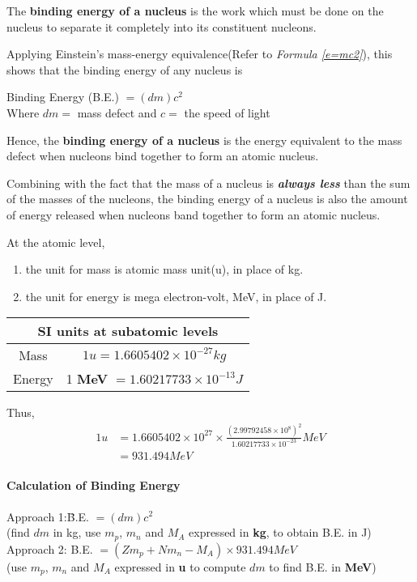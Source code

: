 \begin{defi}
The \textbf{binding energy of a nucleus} is the work which must be done on the nucleus to separate it completely into its constituent nucleons.
\end{defi}
Applying Einstein's mass-energy equivalence(Refer to \textit{Formula \ref{e=mc2}}), this shows that the binding energy of any nucleus is
\begin{form}
Binding Energy (B.E.) $ = ( d m) c^2$\\
Where $d m = $ mass defect and $c =$ the speed of light
\end{form}
Hence, the \textbf{binding energy of a nucleus} is the energy equivalent to the mass defect when nucleons bind together to form an atomic nucleus.

Combining with the fact that the mass of a nucleus is \textbf{\textit{always less}} than the sum of the masses of the nucleons, the binding energy of a nucleus is also the amount of energy released when nucleons band together to form an atomic nucleus.

At the atomic level,
\begin{enumerate}
\item the unit for mass is atomic mass unit(u), in place of kg.
\item the unit for energy is mega electron-volt, MeV, in place of J.
\end{enumerate}

\begin{center}
\begin{tabular}{ c c} \toprule
\multicolumn{2}{c}{SI units at subatomic levels}\\ \midrule \vspace{2pt}
Mass & $1u = 1.6605402 \times 10^{-27}kg$ \\
Energy & 1\textbf{ MeV} $= 1.60217733 \times 10^{-13}J$\\ \bottomrule
\end{tabular}
\end{center}

Thus,
\begin{equation*}
\begin{split}
1u &= 1.6605402 \times 10^{27} \times \frac{(2.99792458 \times 10^8)^2}{1.60217733 \times 10^{-23}}MeV\\
&= 931.494MeV
\end{split}
\end{equation*}
\paragraph{Calculation of Binding Energy}
\begin{tabbing}
Approach 1:\quad \= B.E. $ = (d m) c^2$\\
\>(find $d m$ in kg, use $m_p$, $m_n$ and $M_A$ expressed in \textbf{kg}, to obtain B.E. in J)\\
Approach 2: \> B.E. $= (Z m_p + Nm_n -M_A) \times 931.494 MeV$\\
\>(use $m_p$, $m_n$ and $M_A$ expressed in \textbf{u} to compute $d m$ to find B.E. in \textbf{MeV})
\end{tabbing}

